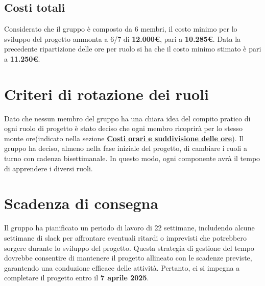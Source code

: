 \documentclass[a4paper, 12pt]{article}
\begin{document}
\subsection{Costi totali}
Considerato che il gruppo è composto da 6 membri, il costo minimo per lo sviluppo del 
progetto ammonta a 6/7 di \textbf{12.000€}, pari a \textbf{10.285€}. 
Data la precedente ripartizione delle ore per ruolo si ha che il costo minimo stimato è pari a \textbf{11.250€}.

\section{Criteri di rotazione dei ruoli}
Dato che nessun membro del gruppo ha una chiara idea del compito pratico di ogni ruolo di progetto è stato deciso che ogni membro ricoprirà per lo stesso monte ore(indicato nella sezione \hyperref[tab:ore]{\textbf{\underline{Costi orari e suddivisione delle ore}}}).
Il gruppo ha deciso, almeno nella fase iniziale del progetto, di cambiare i ruoli a turno con cadenza bisettimanale. In questo modo, ogni componente avrà il tempo di apprendere i diversi ruoli.

\section{Scadenza di consegna}
Il gruppo ha pianificato un periodo di lavoro di 22 settimane, includendo alcune settimane di slack per affrontare eventuali ritardi o imprevisti che potrebbero sorgere durante lo sviluppo del progetto.
Questa strategia di gestione del tempo dovrebbe consentire di mantenere il progetto allineato con le scadenze previste, garantendo una conduzione efficace delle attività.
Pertanto, ci si impegna a completare il progetto entro il \textbf{7 aprile 2025}.
\end{document}

